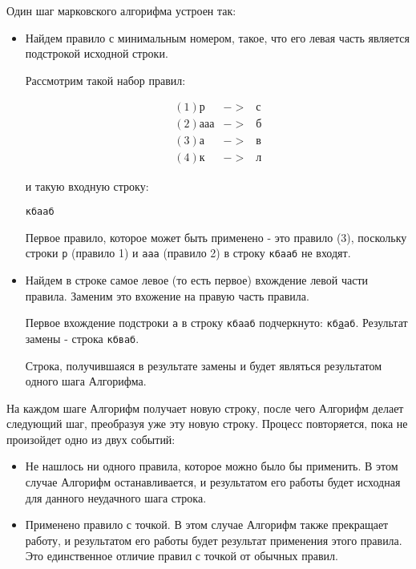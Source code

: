 \documentclass[12pt,a4paper,oneside]{article}
\newcommand{\s}[1]{\texttt{#1}}
\begin{document}
\vspace{3 mm}
Один шаг марковского алгорифма устроен так: 
\begin{itemize}
\item Найдем правило с минимальным номером, такое, что его левая 
часть является подстрокой исходной строки.

\begin{example}Рассмотрим такой набор правил:
\begin{bnf}\begin{eqnarray*}
   (1) \s{р}&->&\s{с}\\
   (2) \s{ааа}&->&\s{б}\\
   (3) \s{а}&->&\s{в}\\
   (4) \s{к}&->&\s{л}
\end{eqnarray*}\end{bnf}  
и такую входную строку:\begin{center}\s{кбааб}\end{center}

Первое правило, которое может быть применено - это правило (3), поскольку
строки \s{р} (правило 1) и \s{ааа} (правило 2) в строку 
\s{кбааб} не входят. 
\end{example}

\item Найдем в строке самое левое (то есть первое) вхождение левой части 
правила. Заменим это вхожение на правую часть правила. 

\begin{example}
   Первое вхождение подстроки \s{а} в строку \s{кбааб} подчеркнуто: 
   \s{кб\underline{а}аб}. Результат замены - строка \s{кбваб}. 
\end{example}

Строка, получившаяся в результате замены и будет являться результатом одного
шага Алгорифма.

\end{itemize}

На каждом шаге Алгорифм получает новую строку,
после чего Алгорифм делает следующий шаг, преобразуя уже эту новую строку.
Процесс повторяется, пока не произойдет одно из двух событий:

\begin{itemize}
\item
Не нашлось ни одного правила, которое можно было бы применить.
В этом случае Алгорифм останавливается, и результатом его работы будет
исходная для данного неудачного шага строка. 

\item
Применено правило с точкой. В этом случае Алгорифм также прекращает работу,
и результатом его работы будет результат применения этого правила.
Это единственное отличие правил с точкой от обычных правил.
\end{itemize}
\end{document}
